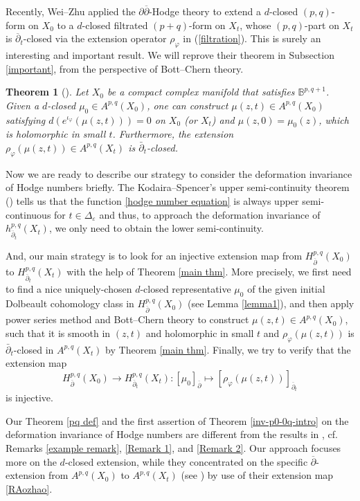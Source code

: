 \documentclass[12pt]{amsart}
\numberwithin{equation}{section}
\theoremstyle{definition}
\theoremstyle{definition}
\theoremstyle{definition}
\renewcommand{\1}{\mathsf{1}}
\newcommand{\db}{\overline{\partial}}
\renewcommand{\>}{\rightarrow}
\newcommand{\p}{\partial}
\newcommand{\bp}{\overline\partial}
\def\p{\partial}
\def\v{\varphi}
\theoremstyle{plain} %
\newtheorem{bigthm}{Theorem}
\theoremstyle{plain} %
\theoremstyle{plain} %
\begin{document}
	Recently, Wei--Zhu \cite{WZ20} applied the $\p\bp$-Hodge theory to extend a $d$-closed $(p,q)$-form on $X_0$ to a $d$-closed filtrated $(p+q)$-form on $X_t$, whose  $(p,q)$-part on $X_t$ is $\bp_{t}$-closed via the extension operator $\rho_\varphi$ in (\ref{filtration}).  This is surely an interesting and important result. We will reprove their theorem in Subsection \ref{important}, from the perspective of Bott--Chern theory.
	
	\begin{bigthm}[{\cite[Theorem 1.1]{WZ20}}]\label{main thm}
		Let  $X_0$ be a compact complex manifold that  satisfies   $\mathbb B^{p,q+1}$. Given a $d$-closed $\mu_{0} \in A^{p, q}(X_0)$, one can construct $\mu(z,t)\in A^{p,q}(X_0)$ satisfying $d(e^{\iota_\varphi}(\mu(z,t)))=0$ on $X_0$ (or $X_t$) and $\mu(z,0)=\mu_0(z)$, which is  holomorphic in small $t$. Furthermore, the extension $\rho_\v(\mu(z,t)) \in A^{p, q}\left(X_{t}\right)$
		is $\bar{\partial}_{t}$-closed.
	\end{bigthm}
	
	Now we are ready to describe our strategy to consider the deformation invariance of Hodge numbers briefly. The Kodaira--Spencer's upper semi-continuity theorem (\cite[Theorem $4$]{KS60}) tells us that the function \eqref{hodge number equation} is always upper semi-continuous for $t\in \Delta_{\varepsilon}$ and thus, to approach the deformation invariance of $h^{p,q}_{\db_t}(X_t)$, we only need to obtain the lower semi-continuity. 
    
    And, our main strategy is to  look for an injective extension map from $H^{p,q}_{\db}(X_0)$ to $H^{p,q}_{\db_t}(X_t)$ with the help of Theorem \ref{main  thm}. More precisely,  we first need to find a nice uniquely-chosen $d$-closed representative $\mu_0$ of the given  initial Dolbeault cohomology class in $H^{p,q}_{\db}(X_0)$ (see Lemma \ref{lemma1}), and then apply power series method and Bott--Chern theory to construct  $\mu(z,t)\in A^{p,q}(X_0)$, such that it is smooth in $(z,t)$ and holomorphic in small $t$ and $\rho_\v(\mu(z,t))$ is $\bar{\partial}_{t}$-closed in $A^{p, q}\left(X_{t}\right)$ by Theorem \ref{main  thm}. Finally, we try to verify that the extension map  $$H^{p,q}_{\db}(X_0) \longrightarrow H^{p,q}_{\db_t}(X_t):[\mu_0]_{\db} \longmapsto [\rho_\v(\mu(z,t))]_{\db_t}$$ is injective.
	
	Our Theorem \ref{pq def} and the first assertion of Theorem \ref{inv-p0-0q-intro} on the deformation invariance of Hodge numbers are different from the results in \cite{RZ18}, cf.  Remarks \ref{example remark}, \ref{Remark 1}, and \ref{Remark 2}. Our approach focuses more on the $d$-closed extension, while they concentrated on the specific $\bp$-extension from $A^{p,q}(X_0)$ to $A^{p,q}(X_t)$ (see \cite[Proposition 1.2]{RZ18}) by use of their extension map \eqref{RAozhao}.
	
\end{document}
